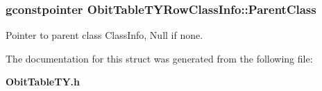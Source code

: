 \subsubsection{\setlength{\rightskip}{0pt plus 5cm}gconstpointer {\bf Obit\-Table\-TYRow\-Class\-Info::Parent\-Class}}\label{structObitTableTYRowClassInfo_o3}


Pointer to parent class Class\-Info, Null if none. 



The documentation for this struct was generated from the following file:\begin{CompactItemize}
\item 
{\bf Obit\-Table\-TY.h}\end{CompactItemize}
